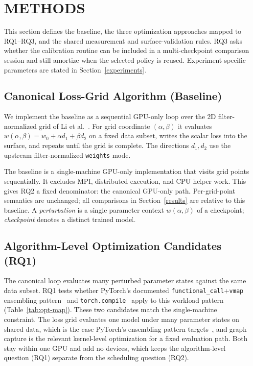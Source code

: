 \section{METHODS}\label{methods}

This section defines the baseline, the three optimization
approaches mapped to RQ1--RQ3, and the shared measurement and
surface-validation rules. RQ3 asks whether the calibration
routine can be included in a multi-checkpoint comparison session and
still amortize when the selected policy is reused.
Experiment-specific parameters are stated in Section~\ref{experiments}.

\subsection{Canonical Loss-Grid Algorithm
(Baseline)}\label{methods-canonical-algorithm}

We implement the baseline as a sequential GPU-only loop over
the 2D filter-normalized grid of Li et
al.~\cite{li2018losslandscape,goldstein_loss_landscape_repo}.
For grid coordinate $(\alpha,\beta)$ it evaluates
$w(\alpha,\beta)=w_0+\alpha d_1+\beta d_2$ on a fixed data
subset, writes the scalar loss into the surface, and repeats
until the grid is complete. The directions $d_1,d_2$ use the
upstream filter-normalized \texttt{weights} mode.

The baseline is a single-machine GPU-only implementation that
visits grid points sequentially. It excludes MPI, distributed
execution, and CPU helper work. This gives RQ2 a fixed
denominator: the canonical GPU-only path. Per-grid-point
semantics are unchanged; all
comparisons in Section~\ref{results} are relative to this
baseline. A \emph{perturbation} is a single parameter context
$w(\alpha,\beta)$ of a checkpoint; \emph{checkpoint} denotes
a distinct trained model.

\subsection{Algorithm-Level Optimization Candidates
(RQ1)}\label{methods-redesign}

The canonical loop evaluates many perturbed parameter states
against the same data subset. RQ1 tests whether PyTorch's
documented \texttt{functional\_call}+\texttt{vmap}
ensembling pattern~\cite{pytorch_functional_call,pytorch_vmap,pytorch_ensembling}
and \texttt{torch.compile}~\cite{pytorch_compile} apply to
this workload pattern (Table~\ref{tab:opt-map}). These two
candidates match the single-machine constraint. The loss grid
evaluates one model under many parameter states on shared data,
which is the case PyTorch's ensembling pattern
targets~\cite{pytorch_ensembling}, and graph capture is the
relevant kernel-level optimization for a fixed evaluation path. Both
stay within one GPU and add no devices, which keeps the
algorithm-level question (RQ1) separate from the scheduling
question (RQ2).

